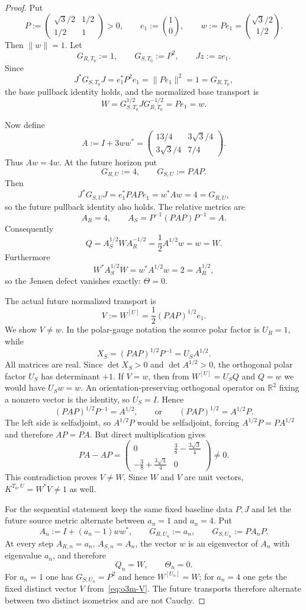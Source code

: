\begin{proof}
Put
\[
 P:=\begin{pmatrix}
 \sqrt3/2&1/2\\[2pt]
 1/2&1
 \end{pmatrix}>0,
 \qquad
 e_1:=\binom10,
 \qquad
 w:=Pe_1=\binom{\sqrt3/2}{1/2}.
\]
Then $\|w\|=1$.  Let
\[
 G_{R,T_0}:=1,
 \qquad
 G_{S,T_0}:=P^2,
 \qquad
 Jz:=ze_1.
\]
Since
\[
 J^*G_{S,T_0}J=e_1^*P^2e_1=\|Pe_1\|^2=1=G_{R,T_0},
\]
the base pullback identity holds, and the normalized base transport is
\[
 W=G_{S,T_0}^{1/2}JG_{R,T_0}^{-1/2}=Pe_1=w.
\]

Now define
\[
 A:=I+3ww^*
 =\begin{pmatrix}
 13/4&3\sqrt3/4\\[2pt]
 3\sqrt3/4&7/4
 \end{pmatrix}.
\]
Thus $Aw=4w$.  At the future horizon put
\[
 G_{R,U}:=4,
 \qquad
 G_{S,U}:=PAP.
\]
Then
\[
 J^*G_{S,U}J
 =e_1^*PAPe_1
 =w^*Aw
 =4
 =G_{R,U},
\]
so the future pullback identity also holds.  The relative metrics are
\[
 A_R=4,
 \qquad
 A_S=P^{-1}(PAP)P^{-1}=A.
\]
Consequently
\[
 Q=A_S^{1/2}WA_R^{-1/2}
 =\frac12A^{1/2}w
 =w
 =W.
\]
Furthermore
\[
 W^*A_S^{1/2}W=w^*A^{1/2}w=2=A_R^{1/2},
\]
so the Jensen defect vanishes exactly: $\Theta=0$.

The actual future normalized transport is
\[
 V:=W^{[U]}
 =\frac12(PAP)^{1/2}e_1.
\tag{O3M.6}\label{eq:o3m-V}
\]
We show $V\ne w$.  In the polar-gauge notation the source polar factor is
$U_R=1$, while
\[
 X_S=(PAP)^{1/2}P^{-1}=U_SA^{1/2}.
\]
All matrices are real.  Since $\det X_S>0$ and $\det A^{1/2}>0$, the orthogonal polar
factor $U_S$ has determinant $+1$.  If $V=w$, then from
$W^{[U]}=U_SQ$ and $Q=w$ we would have $U_Sw=w$.  An orientation-preserving orthogonal
operator on $\mathbb R^2$ fixing a nonzero vector is the identity, so $U_S=I$.
Hence
\[
 (PAP)^{1/2}P^{-1}=A^{1/2},
 \qquad\text{or}\qquad
 (PAP)^{1/2}=A^{1/2}P.
\]
The left side is selfadjoint, so $A^{1/2}P$ would be selfadjoint, forcing
$A^{1/2}P=PA^{1/2}$ and therefore $AP=PA$.  But direct multiplication gives
\[
 PA-AP
 =\begin{pmatrix}
 0&\frac38-\frac{3\sqrt3}{4}\\[2pt]
 -\frac38+\frac{3\sqrt3}{4}&0
 \end{pmatrix}\ne0.
\]
This contradiction proves $V\ne W$.  Since $W$ and $V$ are unit vectors,
$K^{T_0,U}=W^*V\ne1$ as well.

For the sequential statement keep the same fixed baseline data $P,J$ and let the future
source metric alternate between $a_n=1$ and $a_n=4$.  Put
\[
 A_n:=I+(a_n-1)ww^*,
 \qquad
 G_{R,U_n}:=a_n,
 \qquad
 G_{S,U_n}:=PA_nP.
\]
At every step $A_{R,n}=a_n$, $A_{S,n}=A_n$, the vector $w$ is an eigenvector of
$A_n$ with eigenvalue $a_n$, and therefore
\[
 Q_n=W,
 \qquad
 \Theta_n=0.
\]
For $a_n=1$ one has $G_{S,U_n}=P^2$ and hence $W^{[U_n]}=W$; for $a_n=4$ one gets the
fixed distinct vector $V$ from~\eqref{eq:o3m-V}.  The future transports therefore
alternate between two distinct isometries and are not Cauchy.
\end{proof}

